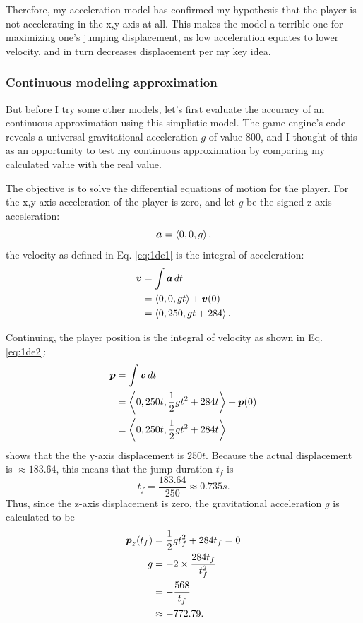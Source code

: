 Therefore, my acceleration model has confirmed my hypothesis that the player is not accelerating in the x,y-axis at all. This makes the model a terrible one for maximizing one's jumping displacement, as low acceleration equates to lower velocity, and in turn decreases displacement per my key idea.

\subsubsection{Continuous modeling approximation}
But before I try some other models, let's first evaluate the accuracy of an continuous approximation using this simplistic model. The game engine's code reveals a universal gravitational acceleration $g$ of value $800$, and I thought of this as an opportunity to test my continuous approximation by comparing my calculated value with the real value.

The objective is to solve the differential equations of motion for the player. For the x,y-axis acceleration of the player is zero, and let $g$ be the signed z-axis acceleration:
\[
    \boldsymbol{a} = \left\langle 0, 0, g \right\rangle,
\]
the velocity as defined in Eq. \ref{eq:1de1} is the integral of acceleration:
\begin{align*}
    \boldsymbol{v} &= \int \boldsymbol{a} \, dt\\
    &= \left\langle 0, 0, gt \right\rangle + \boldsymbol{v}(0)\\
    &= \left\langle 0, 250, gt + 284 \right\rangle.
\end{align*}

Continuing, the player position is the integral of velocity as shown in Eq. \ref{eq:1de2}:
\begin{align*}
    \boldsymbol{p} &= \int \boldsymbol{v} \, dt\\
    &= \left\langle 0, 250t, \frac{1}{2}gt^2 + 284t \right\rangle + \boldsymbol{p}(0)\\
    &= \left\langle 0, 250t, \frac{1}{2}gt^2 + 284t \right\rangle
\end{align*}
shows that the the y-axis displacement is $250t$. Because the actual displacement is $\approx 183.64$, this means that the jump duration $t_f$ is
\[
    t_f = \frac{183.64}{250} \approx 0.735 \si{s}.
\]
Thus, since the z-axis displacement is zero, the gravitational acceleration $g$ is calculated to be
\begin{align*}
    \boldsymbol{p}_{z}(t_f) &= \frac{1}{2}gt_f^2 + 284t_f = 0\\
    g &= - 2 \times \frac{284t_f}{t_f^2}\\
    &= -\frac{568}{t_f}\\
    &\approx -772.79.
\end{align*}

